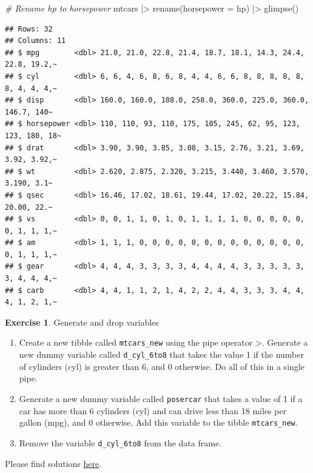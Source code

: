 \documentclass[
  12pt,
  oneside]{book}
\newenvironment{Shaded}{\begin{snugshade}}{\end{snugshade}}
\newcommand{\AttributeTok}[1]{\textcolor[rgb]{0.77,0.63,0.00}{#1}}
\newcommand{\CommentTok}[1]{\textcolor[rgb]{0.56,0.35,0.01}{\textit{#1}}}
\newcommand{\FunctionTok}[1]{\textcolor[rgb]{0.00,0.00,0.00}{#1}}
\newcommand{\NormalTok}[1]{#1}
\newcommand{\SpecialCharTok}[1]{\textcolor[rgb]{0.00,0.00,0.00}{#1}}
\theoremstyle{definition}
\theoremstyle{definition}
\theoremstyle{definition}
\newtheorem{exercise}{Exercise}[chapter]
\theoremstyle{definition}
\theoremstyle{remark}
\begin{document}
\begin{Shaded}
\begin{Highlighting}[]
\CommentTok{\# Rename hp to horsepower}
\NormalTok{mtcars }\SpecialCharTok{|\textgreater{}} 
  \FunctionTok{rename}\NormalTok{(}\AttributeTok{horsepower =}\NormalTok{ hp) }\SpecialCharTok{|\textgreater{}} 
  \FunctionTok{glimpse}\NormalTok{()}
\end{Highlighting}
\end{Shaded}

\begin{verbatim}
## Rows: 32
## Columns: 11
## $ mpg        <dbl> 21.0, 21.0, 22.8, 21.4, 18.7, 18.1, 14.3, 24.4, 22.8, 19.2,~
## $ cyl        <dbl> 6, 6, 4, 6, 8, 6, 8, 4, 4, 6, 6, 8, 8, 8, 8, 8, 8, 4, 4, 4,~
## $ disp       <dbl> 160.0, 160.0, 108.0, 258.0, 360.0, 225.0, 360.0, 146.7, 140~
## $ horsepower <dbl> 110, 110, 93, 110, 175, 105, 245, 62, 95, 123, 123, 180, 18~
## $ drat       <dbl> 3.90, 3.90, 3.85, 3.08, 3.15, 2.76, 3.21, 3.69, 3.92, 3.92,~
## $ wt         <dbl> 2.620, 2.875, 2.320, 3.215, 3.440, 3.460, 3.570, 3.190, 3.1~
## $ qsec       <dbl> 16.46, 17.02, 18.61, 19.44, 17.02, 20.22, 15.84, 20.00, 22.~
## $ vs         <dbl> 0, 0, 1, 1, 0, 1, 0, 1, 1, 1, 1, 0, 0, 0, 0, 0, 0, 1, 1, 1,~
## $ am         <dbl> 1, 1, 1, 0, 0, 0, 0, 0, 0, 0, 0, 0, 0, 0, 0, 0, 0, 1, 1, 1,~
## $ gear       <dbl> 4, 4, 4, 3, 3, 3, 3, 4, 4, 4, 4, 3, 3, 3, 3, 3, 3, 4, 4, 4,~
## $ carb       <dbl> 4, 4, 1, 1, 2, 1, 4, 2, 2, 4, 4, 3, 3, 3, 4, 4, 4, 1, 2, 1,~
\end{verbatim}

\begin{exercise}
\protect\hypertarget{exr:genanddrop}{}\label{exr:genanddrop}Generate and drop variables

\begin{enumerate}
\def\labelenumi{\alph{enumi})}
\item
  Create a new tibble called \texttt{mtcars\_new} using the pipe operator \textbar\textgreater. Generate a new dummy variable called \texttt{d\_cyl\_6to8} that takes the value 1 if the number of cylinders (cyl) is greater than 6, and 0 otherwise. Do all of this in a single pipe.
\item
  Generate a new dummy variable called \texttt{posercar} that takes a value of 1 if a car has more than 6 cylinders (cyl) and can drive less than 18 miles per gallon (mpg), and 0 otherwise. Add this variable to the tibble \texttt{mtcars\_new}.
\item
  Remove the variable \texttt{d\_cyl\_6to8} from the data frame.
\end{enumerate}

Please find solutions \href{https://raw.githubusercontent.com/hubchev/courses/main/scr/exe_genanddrop.R}{here}.
\end{exercise}
\end{document}
